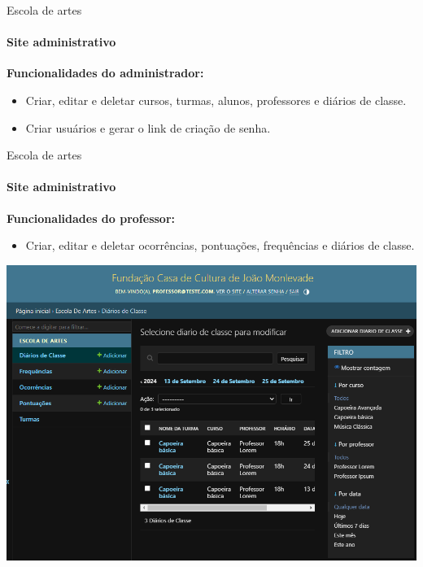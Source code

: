 \begin{frame}{Escola de artes}
    \framesubtitle{Site administrativo}
    \textbf{Funcionalidades do administrador:}

    \begin{itemize}
        \item Criar, editar e deletar cursos, turmas, alunos, professores e diários de classe.
        \item Criar usuários e gerar o link de criação de senha.
    \end{itemize}

\end{frame}

\begin{frame}{Escola de artes}
    \framesubtitle{Site administrativo}
    \textbf{Funcionalidades do professor:}

    \begin{itemize}
        \item Criar, editar e deletar ocorrências, pontuações, frequências e diários de classe.
    \end{itemize}
        
        \vspace{\baselineskip}
        
            \begin{center}
                \includegraphics[scale=0.25]{beamerthemesrc/assets/admin_professor.png}
            \end{center}
\end{frame}

